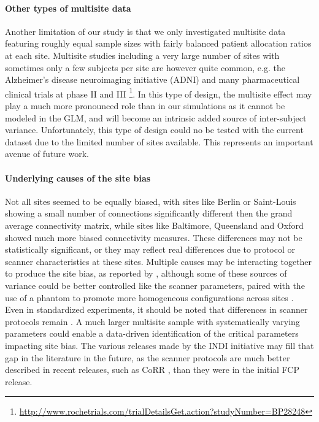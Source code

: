 \documentclass[authoryear]{elsarticle}
\begin{document}
\paragraph{Other types of multisite data} Another limitation of our study is that we only investigated multisite data featuring roughly equal sample sizes with fairly balanced patient allocation ratios at each site. Multisite studies including a very large number of sites with sometimes only a few subjects per site are however quite common, e.g. the Alzheimer's disease neuroimaging initiative (ADNI) \citep{Mueller2005} and many pharmaceutical clinical trials at phase II and III \footnote{\url{http://www.rochetrials.com/trialDetailsGet.action?studyNumber=BP28248}}. In this type of design, the multisite effect may play a much more pronounced role than in our simulations as it cannot be modeled in the GLM, and will become an intrinsic added source of inter-subject variance. Unfortunately, this type of design could no be tested with the current dataset due to the limited number of sites available. This represents an important avenue of future work. 

\paragraph{Underlying causes of the site bias}
Not all sites seemed to be equally biased, with sites like Berlin or Saint-Louis showing a small number of connections significantly different then the grand average connectivity matrix, while sites like Baltimore, Queensland and Oxford showed much more biased connectivity measures. These differences may not be statistically significant, or they may reflect real differences due to protocol or scanner characteristics at these sites. Multiple causes may be interacting together to produce the site bias, as reported by \cite{Yan2013a}, although some of these sources of variance could be better controlled like the scanner parameters, paired with the use of a phantom to promote more homogeneous configurations across sites \citep{Friedman2006,Friedman2006a,Glover2012}. Even in standardized experiments, it should be noted that differences in scanner protocols remain \citep{Brown2011}. A much larger multisite sample with systematically varying parameters could enable a data-driven identification of the critical parameters impacting site bias. The various releases made by the INDI initiative may fill that gap in the literature in the future, as the scanner protocols are much better described in recent releases, such as CoRR \citep{Zuo2014-ec}, than they were in the initial FCP release.
\end{document}
